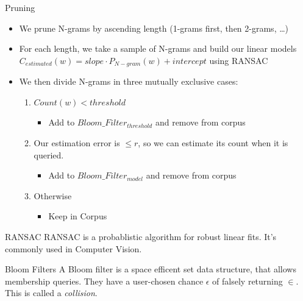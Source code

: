 \documentclass[16:9,en,navbarinfooter]{sdqbeamer}
\begin{document}
\begin{frame}{Pruning}
\vspace{.9cm}
    \begin{itemize}
        \item We prune N-grams by ascending length (1-grams first, then 2-grams, \ldots)
        \item For each length, we take a sample of N-grams and build our linear models
            $C_{estimated}(w) = slope \cdot P_{N-gram}(w) + intercept$ using RANSAC
        \item We then divide N-grams in three mutually exclusive cases:
\begin{enumerate}
\def\labelenumi{\arabic{enumi}.}
\item $Count(w) < threshold$
    \begin{itemize}
            \item Add to $Bloom\_Filter_{threshold}$ and remove from corpus
    \end{itemize}
\item Our estimation error is $\leq r$, so we can estimate its count when it is queried.
    \begin{itemize}
            \item Add to $Bloom\_Filter_{model}$ and remove from corpus
    \end{itemize}
\item Otherwise
    \begin{itemize}
        \item Keep in Corpus
    \end{itemize}
\end{enumerate}
\end{itemize}
    \begin{block}{RANSAC}
    RANSAC is a probablistic algorithm for robust linear fits. It's commonly used in Computer Vision.
    \end{block}
    \begin{block}{Bloom Filters}
    A Bloom filter is a space efficent set data structure, that allows membership queries.
    They have a user-chosen chance $\epsilon$ of falsely returning $\in$. This is called a \emph{collision}.
    \end{block}

\end{frame}
\end{document}
